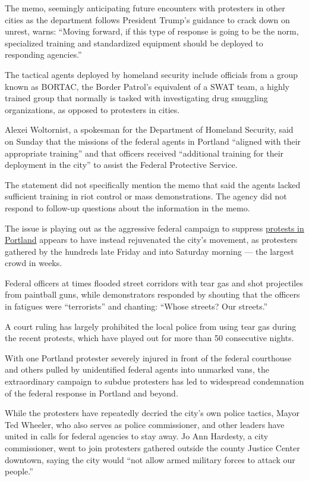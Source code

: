 The memo, seemingly anticipating future encounters with protesters in
other cities as the department follows President Trump's guidance to
crack down on unrest, warns: ``Moving forward, if this type of response
is going to be the norm, specialized training and standardized equipment
should be deployed to responding agencies.''

The tactical agents deployed by homeland security include officials from
a group known as BORTAC, the Border Patrol's equivalent of a SWAT team,
a highly trained group that normally is tasked with investigating drug
smuggling organizations, as opposed to protesters in cities.

Alexei Woltornist, a spokesman for the Department of Homeland Security,
said on Sunday that the missions of the federal agents in Portland
``aligned with their appropriate training'' and that officers received
``additional training for their deployment in the city'' to assist the
Federal Protective Service.

The statement did not specifically mention the memo that said the agents
lacked sufficient training in riot control or mass demonstrations. The
agency did not respond to follow-up questions about the information in
the memo.

The issue is playing out as the aggressive federal campaign to suppress
\href{https://www.nytimes.com/2020/07/20/us/portland-protests-navy-christopher-david.html}{protests
in Portland} appears to have instead rejuvenated the city's movement, as
protesters gathered by the hundreds late Friday and into Saturday
morning --- the largest crowd in weeks.

Federal officers at times flooded street corridors with tear gas and
shot projectiles from paintball guns, while demonstrators responded by
shouting that the officers in fatigues were ``terrorists'' and chanting:
``Whose streets? Our streets.''

A court ruling has largely prohibited the local police from using tear
gas during the recent protests, which have played out for more than 50
consecutive nights.

With one Portland protester severely injured in front of the federal
courthouse and others pulled by unidentified federal agents into
unmarked vans, the extraordinary campaign to subdue protesters has led
to widespread condemnation of the federal response in Portland and
beyond.

While the protesters have repeatedly decried the city's own police
tactics, Mayor Ted Wheeler, who also serves as police commissioner, and
other leaders have united in calls for federal agencies to stay away. Jo
Ann Hardesty, a city commissioner, went to join protesters gathered
outside the county Justice Center downtown, saying the city would ``not
allow armed military forces to attack our people.''


